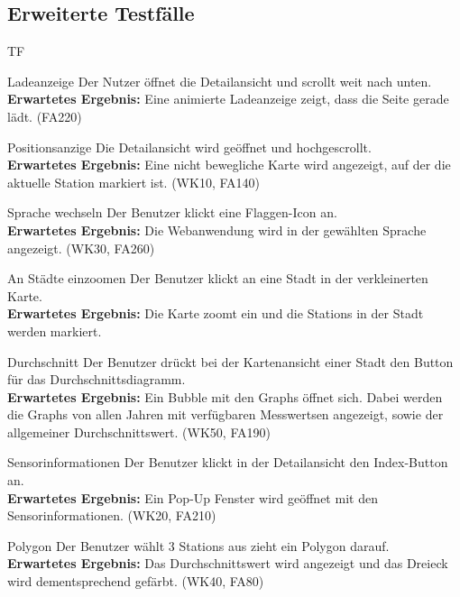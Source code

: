 \subsection{Erweiterte Testfälle}
\begin{Kriterien}{TF}

	\item[Ladeanzeige] Der Nutzer öffnet die  \gls{Detailansicht} und scrollt weit nach unten. \\ \textbf{Erwartetes Ergebnis:} Eine animierte Ladeanzeige zeigt, dass die Seite gerade lädt. (FA220)

	\item[Positionsanzige] Die Detailansicht wird geöffnet und hochgescrollt. \\ \textbf{Erwartetes Ergebnis:} Eine nicht bewegliche Karte wird angezeigt, auf der die aktuelle Station markiert ist. (WK10, FA140)
	
	\item[Sprache wechseln] Der Benutzer klickt eine Flaggen-Icon an. \\ \textbf{Erwartetes Ergebnis:} Die Webanwendung wird in der gewählten Sprache angezeigt. (WK30, FA260) 
	
	\item[An Städte einzoomen] Der Benutzer klickt an eine Stadt in der verkleinerten Karte. \\ \textbf{Erwartetes Ergebnis:} Die Karte zoomt ein und die \glspl{Station} in der Stadt werden markiert.
	
	\item[Durchschnitt] Der Benutzer drückt bei der Kartenansicht einer Stadt den Button für das Durchschnittsdiagramm. \\ \textbf{Erwartetes Ergebnis:} Ein Bubble mit den \glspl{Graph} öffnet sich. Dabei werden die \glspl{Graph} von allen Jahren mit verfügbaren \glspl{Messwert}en angezeigt, sowie der allgemeiner Durchschnittswert. (WK50, FA190)
	
	\item[Sensorinformationen] Der Benutzer klickt in der Detailansicht den Index-Button an. \\ \textbf{Erwartetes Ergebnis:}  Ein Pop-Up Fenster
wird geöffnet mit den Sensorinformationen. (WK20, FA210)

\item[Polygon] Der Benutzer wählt 3 \glspl{Station} aus zieht ein Polygon darauf. \\ \textbf{Erwartetes Ergebnis:} Das Durchschnittswert wird angezeigt und das Dreieck wird dementsprechend gefärbt. (WK40, FA80)


\end{Kriterien}

